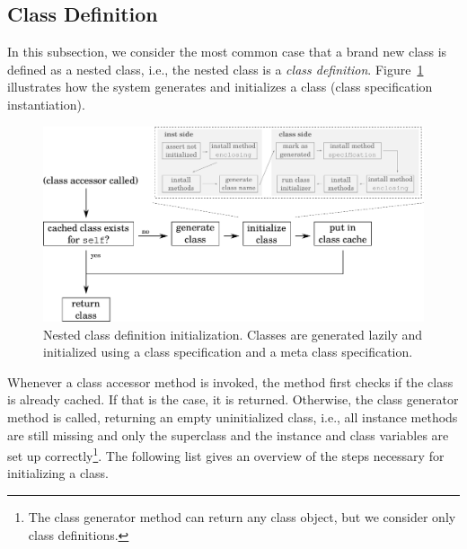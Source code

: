 \subsection{Class Definition}
In this subsection, we consider the most common case that a brand new class is defined as a nested class, i.e., the nested class is a \emph{class definition}. Figure~\ref{fig:lazy_class_gen} illustrates how the system generates and initializes a class (class specification instantiation). 

\begin{figure}[!hbp]
	\includegraphics[width=\textwidth]{lazy_class_gen.pdf}
	\centering
	\caption[Nested class definition initialization]{Nested class definition initialization. Classes are generated lazily and initialized using a class specification and a meta class specification.}
	\label{fig:lazy_class_gen}
\end{figure}

Whenever a class accessor method is invoked, the method first checks if the class is already cached. If that is the case, it is returned. Otherwise, the class generator method is called, returning an empty uninitialized class, i.e., all instance methods are still missing and only the superclass and the instance and class variables are set up correctly\footnote{The class generator method can return any class object, but we consider only class definitions.}. The following list gives an overview of the steps necessary for initializing a class.

